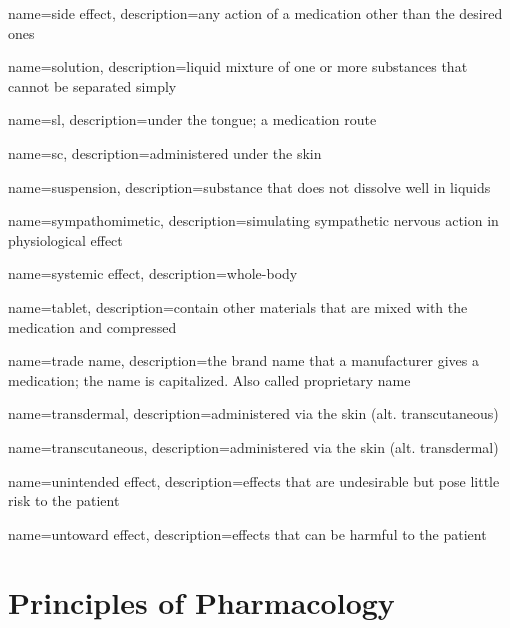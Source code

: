\documentclass[../../EMT-169.tex]{subfiles}
\begin{document}
	{
		name=side effect,
		description={any action of a medication other than the desired ones}
	}

	{
		name=solution,
		description={liquid mixture of one or more substances that cannot be separated simply}
	}

	{
		name=\acrfull{sl},
		description={under the tongue; a medication route}
	}

	{
		name=\acrfull{sc},
		description={administered under the skin}
	}

	{
		name=suspension,
		description={substance that does not dissolve well in liquids}
	}

	{
		name=sympathomimetic,
		description={simulating sympathetic nervous action in physiological effect}
	}

	{
		name=systemic effect,
		description={whole-body}
	}

	{
		name=tablet,
		description={contain other materials that are mixed with the medication and compressed}
	}

	{
		name=trade name,
		description={the brand name that a manufacturer gives a medication; the name is capitalized. \newline Also called proprietary name}
	}

	{
		name=transdermal,
		description={administered via the skin (alt. transcutaneous)}
	}

	{
		name=transcutaneous,
		description={administered via the skin (alt. transdermal)}
	}

	{
		name=unintended effect,
		description={effects that are undesirable but pose little risk to the patient}
	}

	{
		name=untoward effect,
		description={effects that can be harmful to the patient}
	}
	
	
\chapter{Principles of Pharmacology}
\end{document}
